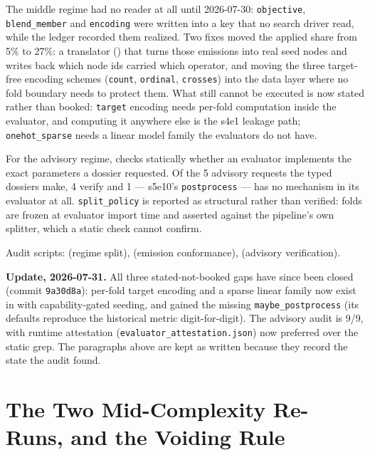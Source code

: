 \documentclass[11pt,a4paper]{article}
\begin{document}
The middle regime had no reader at all until 2026-07-30: \texttt{objective}, \texttt{blend\_member}
and \texttt{encoding} were written into a key that no search driver read, while the ledger recorded
them realized. Two fixes moved the applied share from 5\% to 27\%: a translator
() that turns those emissions into real seed nodes and
writes back which node ids carried which operator, and moving the three target-free encoding
schemes (\texttt{count}, \texttt{ordinal}, \texttt{crosses}) into the data layer where no fold
boundary needs to protect them. What still cannot be executed is now stated rather than booked:
\texttt{target} encoding needs per-fold computation inside the evaluator, and computing it
anywhere else is the s4e1 leakage path; \texttt{onehot\_sparse} needs a linear model family the
evaluators do not have.

For the advisory regime,  checks statically whether an
evaluator implements the exact parameters a dossier requested. Of the 5 advisory requests the
typed dossiers make, 4 verify and 1 --- s5e10's \texttt{postprocess} --- has no mechanism in its
evaluator at all. \texttt{split\_policy} is reported as structural rather than verified: folds
are frozen at evaluator import time and asserted against the pipeline's own splitter, which a
static check cannot confirm.

Audit scripts:  (regime split),
 (emission conformance),
 (advisory verification).

\textbf{Update, 2026-07-31.} All three stated-not-booked gaps have since been closed
(commit \texttt{9a30d8a}): per-fold target encoding and a sparse linear family now exist in
 with capability-gated seeding, and 
gained the missing \texttt{maybe\_postprocess} (its defaults reproduce the historical metric
digit-for-digit). The advisory audit is 9/9, with runtime attestation
(\texttt{evaluator\_attestation.json}) now preferred over the static grep. The paragraphs
above are kept as written because they record the state the audit found.


\section{The Two Mid-Complexity Re-Runs, and the Voiding Rule}
\label{app:reruns}
\end{document}
